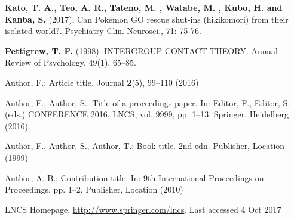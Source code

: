 \documentclass[runningheads]{llncs}
\begin{document}
\begin{thebibliography}{8}
 \textbf{Kato, T. A., Teo, A. R., Tateno, M. , Watabe, M. , Kubo, H. and Kanba, S.} (2017), Can Pokémon GO rescue shut‐ins (hikikomori) from their isolated world?. Psychiatry Clin. Neurosci., 71: 75-76. 

 \textbf{Pettigrew, T. F.} (1998). INTERGROUP CONTACT THEORY. Annual Review of Psychology, 49(1), 65–85. 

Author, F.: Article title. Journal \textbf{2}(5), 99--110 (2016)

Author, F., Author, S.: Title of a proceedings paper. In: Editor,
F., Editor, S. (eds.) CONFERENCE 2016, LNCS, vol. 9999, pp. 1--13.
Springer, Heidelberg (2016). 

Author, F., Author, S., Author, T.: Book title. 2nd edn. Publisher,
Location (1999)

Author, A.-B.: Contribution title. In: 9th International Proceedings
on Proceedings, pp. 1--2. Publisher, Location (2010)

LNCS Homepage, \url{http://www.springer.com/lncs}. Last accessed 4
Oct 2017
\end{thebibliography}
\end{document}
